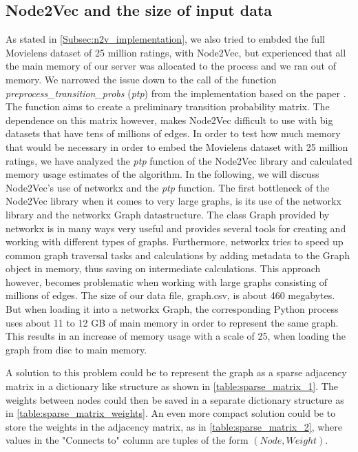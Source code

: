 \subsection{Node2Vec and the size of input data}\label{AP:N2V}

As stated in \autoref{Subsec:n2v_implementation}, we also tried to embded the full Movielens dataset of 25 million ratings, with Node2Vec, but experienced that all the main memory of our server was allocated to the process and we ran out of memory. We narrowed the issue down to the call of the function  \textit{preprocess\_transition\_probs} (\textit{ptp}) from the implementation based on the paper \cite{Node2vec}.
The function aims to create a preliminary transition probability matrix. The dependence on this matrix however, makes Node2Vec difficult to use with big datasets that have tens of millions of edges.
In order to test how much memory that would be necessary in order to embed the Movielens dataset with 25 million ratings, we have analyzed the \textit{ptp} function of the Node2Vec library and calculated memory usage estimates of the algorithm.
In the following, we will discuss Node2Vec's use of networkx and the \textit{ptp} function.
The first bottleneck of the Node2Vec library when it comes to very large graphs, is its use of the networkx library and the networkx Graph datastructure.
The class Graph provided by networkx is in many ways very useful and provides several tools for creating and working with different types of graphs. Furthermore, networkx tries to speed up common graph traversal tasks and calculations by adding metadata to the Graph object in memory, thus saving on intermediate calculations.
This approach however, becomes problematic when working with large graphs consisting of millions of edges.
The size of our data file, graph.csv, is about 460 megabytes. But when loading it into a networkx Graph, the corresponding Python process uses about 11 to 12 GB of main memory in order to represent the same graph.
This results in an increase of memory usage with a scale of 25, when loading the graph from disc to main memory.

A solution to this problem could be to represent the graph as a sparse adjacency matrix in a dictionary like structure as shown in \autoref{table:sparse_matrix_1}.
The weights between nodes could then be saved in a separate dictionary structure as in \autoref{table:sparse_matrix_weights}.
An even more compact solution could be to store the weights in the adjacency matrix, as in \autoref{table:sparse_matrix_2}, where values in the "Connects to" column are tuples of the form $(Node, Weight)$.

